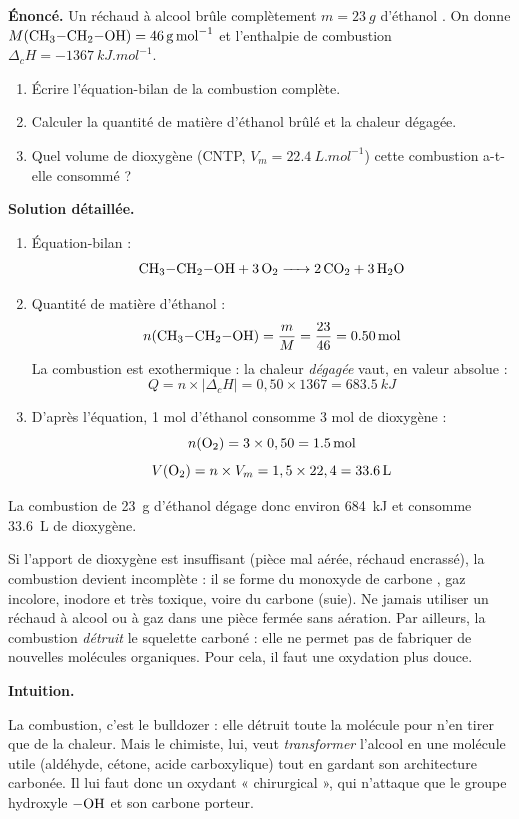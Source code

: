 \documentclass[11pt]{article}
\newcommand{\cle}[1]{{\popxbold\color{popdark}#1}}
\newcounter{popsec}
\newcounter{popsub}
\newcommand{\courssub}[1]{%
  \stepcounter{popsub}%
  \par\vspace{9pt}\noindent{\popxbold\fontsize{11.5}{13}\selectfont\color{popink}{\color{poporange}\thepopsec.\thepopsub}\hspace{6pt}#1}\par\nopagebreak\vspace{4pt}
}
\begin{document}
\begin{exoresolu}
\textbf{Énoncé.} Un réchaud à alcool brûle complètement $m = \SI{23}{g}$ d'éthanol . On donne $M(\ce{CH3-CH2-OH}) = \SI{46}{g.mol^{-1}}$ et l'enthalpie de combustion $\Delta_c H = \SI{-1367}{kJ.mol^{-1}}$.
\begin{enumerate}
\item Écrire l'équation-bilan de la combustion complète.
\item Calculer la quantité de matière d'éthanol brûlé et la chaleur dégagée.
\item Quel volume de dioxygène (CNTP, $V_m = \SI{22,4}{L.mol^{-1}}$) cette combustion a-t-elle consommé ?
\end{enumerate}
\tcblower
\textbf{Solution détaillée.}
\begin{enumerate}
\item Équation-bilan : \[ \ce{CH3-CH2-OH + 3 O2 -> 2 CO2 + 3 H2O} \]
\item Quantité de matière d'éthanol :
\[ n(\ce{CH3-CH2-OH}) = \frac{m}{M} = \frac{23}{46} = \SI{0,50}{mol} \]
La combustion est exothermique : la chaleur \emph{dégagée} vaut, en valeur absolue :
\[ Q = n \times |\Delta_c H| = 0,50 \times 1367 = \SI{683,5}{kJ} \]
\item D'après l'équation, 1 mol d'éthanol consomme 3 mol de dioxygène :
\[ n(\ce{O2}) = 3 \times 0,50 = \SI{1,5}{mol} \]
\[ V(\ce{O2}) = n \times V_m = 1,5 \times 22,4 = \SI{33,6}{L} \]
\end{enumerate}
La combustion de \SI{23}{g} d'éthanol dégage donc environ \SI{684}{kJ} et consomme \SI{33,6}{L} de dioxygène.
\end{exoresolu}

\begin{attention}
Si l'apport de dioxygène est insuffisant (pièce mal aérée, réchaud encrassé), la combustion devient \cle{incomplète} : il se forme du \cle{monoxyde de carbone} , gaz incolore, inodore et très toxique, voire du carbone (suie). Ne jamais utiliser un réchaud à alcool ou à gaz dans une pièce fermée sans aération. Par ailleurs, la combustion \emph{détruit} le squelette carboné : elle ne permet pas de fabriquer de nouvelles molécules organiques. Pour cela, il faut une oxydation plus douce.
\end{attention}

\courssub{La notion d'oxydation ménagée}

\textbf{Intuition.}\par
La combustion, c'est le bulldozer : elle détruit toute la molécule pour n'en tirer que de la chaleur. Mais le chimiste, lui, veut \emph{transformer} l'alcool en une molécule utile (aldéhyde, cétone, acide carboxylique) tout en gardant son architecture carbonée. Il lui faut donc un oxydant « chirurgical », qui n'attaque que le groupe hydroxyle $-\ce{OH}$ et son carbone porteur.
\end{document}
